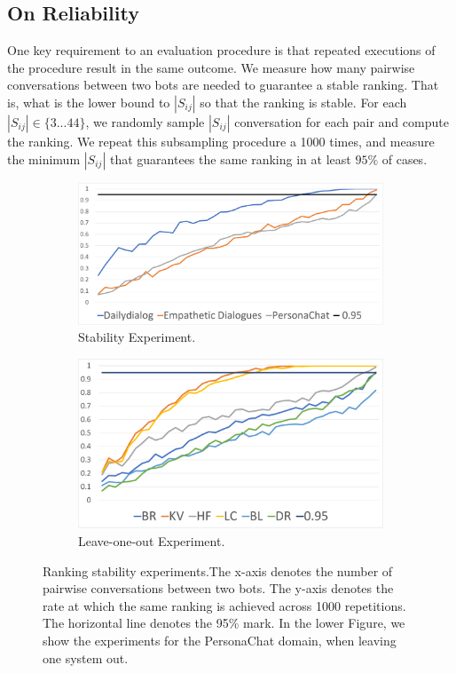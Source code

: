 \documentclass[11pt,a4paper]{article}
\begin{document}
\subsection{On Reliability}
One key requirement to an evaluation procedure is that repeated executions of the procedure result in the same outcome. We measure how many pairwise conversations between two bots are needed to guarantee a stable ranking. That is, what is the lower bound to $|S_{ij}|$ so that the ranking is stable. For each $|S_{ij}| \in \{3 ... 44\}$, we randomly sample $|S_{ij}|$ conversation for each pair and compute the ranking. We repeat this subsampling procedure a 1000 times, and measure the minimum $|S_{ij}|$ that guarantees the same ranking in at least $95\%$ of cases.
\begin{figure}[h!]
  \begin{subfigure}[b]{0.45\textwidth}
    \includegraphics[width=\textwidth]{figures/rankig-sigificance.pdf}
    \caption{Stability Experiment.}
    \label{fig:ranking-significance}
  \end{subfigure}
  \begin{subfigure}[b]{0.45\textwidth}
    \includegraphics[width=\textwidth]{figures/rankig-sigificance-loo.pdf}
    \caption{Leave-one-out Experiment.}
    \label{fig:ranking-significance-loo}
  \end{subfigure}
  \caption{Ranking stability experiments.The x-axis denotes the number of pairwise conversations between two bots. The y-axis denotes the rate at which the same ranking is achieved across 1000 repetitions. The horizontal line denotes the 95\% mark. In the lower Figure, we show the experiments for the PersonaChat domain, when leaving one system out.}
\end{figure}
\end{document}
